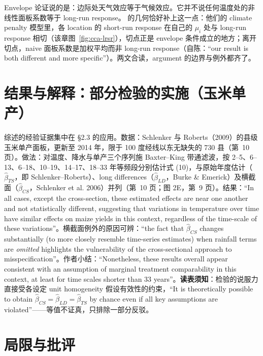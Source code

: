 \begin{intuition}
Envelope 论证说的是：边际处天气效应等于气候效应。它并不说任何温度处的非线性面板系数等于 long-run response。 的几何恰好补上这一点：他们的 climate penalty 模型里，各 location 的 short-run response 在自己的 $\mu_i$ 处与 long-run response 相切（该章图~\ref{fig:cca-lrsr}），切点正是 envelope 条件成立的地方；离开切点，naive 面板系数是加权平均而非 long-run response（自陈：``our result is both different and more specific''\citep[第~1217 页]{merel2021climate}）。两文合读，argument 的边界与例外都齐了。
\end{intuition}

\section{结果与解释：部分检验的实施（玉米单产）}

综述的经验证据集中在 \S 2.3 的应用。数据：Schlenker 与 Roberts（2009）的县级玉米单产面板，更新至 2014 年，限于 100 度经线以东无缺失的 730 县（第~10 页）。做法：对温度、降水与单产三个序列施 Baxter--King 带通滤波，按 2--5、6--13、6--18、10--19、14--17、18--33 年等频段分别估计式 (10)，与原始年度估计（$\hat\beta_{TS}$，即 Schlenker--Roberts）、long differences（$\hat\beta_{LD}$，Burke \& Emerick）及横截面（$\hat\beta_{CS}$，Schlenker et al. 2006）并列（第~10 页；图 2E，第~9 页）。结果：``In all cases, except the cross-section, these estimated effects are near one another and not statistically different, suggesting that variations in temperature over time have similar effects on maize yields in this context, regardless of the time-scale of these variations''\citep[第~10 页]{hsiang2016climate}。横截面例外的原因可辨：``the fact that $\hat\beta_{CS}$ changes substantially (to more closely resemble time-series estimates) when rainfall terms are \emph{omitted} highlights the vulnerability of the cross-sectional approach to misspecification''\citep[第~10 页]{hsiang2016climate}。作者小结：``Nonetheless, these results overall appear consistent with an assumption of marginal treatment comparability in this context, at least for time scales shorter than 33 years''\citep[第~10 页]{hsiang2016climate}。\textbf{读表须知}：检验的说服力直接受各设定 unit homogeneity 假设有效性的约束，``It is theoretically possible to obtain $\hat\beta_{CS}=\hat\beta_{LD}=\hat\beta_{TS}$ by chance even if all key assumptions are violated''\citep[第~10 页]{hsiang2016climate}——等值不证真，只排除一部分反驳。

\section{局限与批评}

